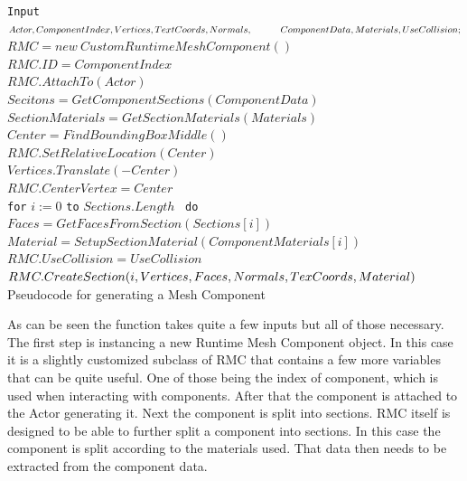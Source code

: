 \begin{algorithm}[htpb]
	\texttt{Input} $Actor, ComponentIndex, Vertices, TextCoords, Normals, \linebreak \null \quad\quad \quad ComponentData, Materials, UseCollision;$\\
	$RMC = new \: CustomRuntimeMeshComponent()$\\
	$RMC.ID = ComponentIndex$\\
	$RMC.AttachTo(Actor)$\\
	$Secitons = GetComponentSections(ComponentData)$\\
	$SectionMaterials = GetSectionMaterials(Materials)$\\
	$Center = FindBoundingBoxMiddle()$\\
	$RMC.SetRelativeLocation(Center)$\\
	$Vertices.Translate(-Center)$\\
	$RMC.CenterVertex = Center$\\
	\texttt{for} $i := 0$ \texttt{to} $Sections.Length$ ~\texttt{do}\\
	\hspace{5mm} $Faces = GetFacesFromSection(Sections[i])$\\
	\hspace{5mm} $Material = SetupSectionMaterial(ComponentMaterials[i])$\\
	\hspace{5mm} $RMC.UseCollision = UseCollision$\\
	\hspace{5mm} $RMC.CreateSection(i, Vertices, Faces, Normals, TexCoords, Material)\newline$\\
	
	\caption{Pseudocode for generating a Mesh Component}
	\label{algo:MeshGeneration}
\end{algorithm}

As can be seen the function takes quite a few inputs but all of those necessary. The first step is instancing a new Runtime Mesh Component object. In this case it is a slightly customized subclass of RMC that contains a few more variables that can be quite useful. One of those being the index of component, which is used when interacting with components. After that the component is attached to the Actor generating it. Next the component is split into sections. RMC itself is designed to be able to further split a component into sections. In this case the component is split according to the materials used. That data then needs to be extracted from the component data. 






